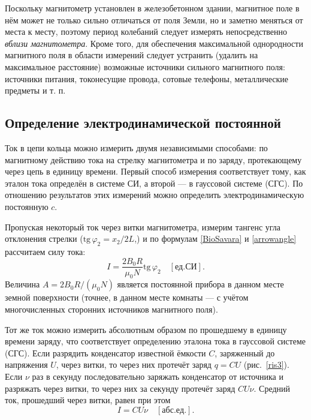 \documentclass[a4paper, 12pt]{article}
\begin{document}
Поскольку магнитометр установлен в железобетонном здании, магнитное поле в нём может не только сильно отличаться от поля Земли, но и заметно меняться от места к месту, поэтому период колебаний следует измерять непосредственно \textit{вблизи магнитометра}. Кроме того, для обеспечения максимальной однородности магнитного поля в области измерений следует устранить (удалить на максимальное расстояние) возможные источники сильного магнитного поля: источники питания, токонесущие провода, сотовые телефоны, металлические предметы и т. п.

\subsection{Определение электродинамической постоянной}

Ток в цепи кольца можно измерить двумя независимыми способами:
по магнитному действию тока на стрелку магнитометра и по заряду,
протекающему через цепь в единицу времени. Первый способ измерения
соответствует тому, как эталон тока определён в системе СИ, а второй --- в гауссовой системе (СГС). По отношению результатов этих измерений можно определить электродинамическую постоянную $c$.

Пропуская некоторый ток через витки магнитометра, измерим тангенс угла отклонения стрелки ($\mathrm{tg}\,\varphi_2 = x_2/2L$,) и по формулам \eqref{BioSavara} и \eqref{arrowangle} рассчитаем силу тока:
\begin{equation}\label{amperage}
I = \frac{2B_0 R}{\mu_0 N} \mathrm{tg}\,\varphi_2 \quad [ед. СИ].
\end{equation}
Величина $A = 2B_0 R/(\mu_0 N)$ является постоянной прибора в данном месте земной поверхности (точнее, в данном месте комнаты --- с учётом многочисленных сторонних источников магнитного поля).

Тот же ток можно измерить абсолютным образом по прошедшему
в единицу времени заряду, что соответствует определению эталона тока в гауссовой системе (СГС). Если разрядить конденсатор известной
ёмкости $C$, заряженный до напряжения $U$, через витки, то через них
протечёт заряд $q = CU$ (рис.~\ref{ris3}). Если $\nu$  раз в секунду последовательно заряжать конденсатор от источника и разряжать через витки, то через них за секунду протечёт заряд $CU\nu$. Средний ток, прошедший через витки, равен при этом
\begin{equation}\label{averamper}
I = CU\nu \quad [абс. ед.].
\end{equation}
\end{document}
